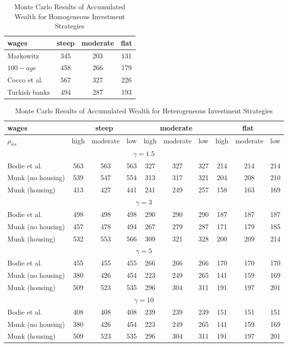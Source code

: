\begin{table}[h!]
	\centering
	\caption{Monte Carlo Results of Accumulated Wealth for Homogeneous Investment Strategies}
	\label{table:wealthhom}
	\begin{tabular}[c]{|l|c|c|c|}
		\hline
		 wages& steep & moderate & flat\\
		\hline
Markowitz					&  345  &   203&   131\\
$100-age$					&  458  &   266&  179\\  
Cocco et al.				&  567  &   327&  226\\  
Turkish banks			 	&  494  &   287&  193\\  
	\hline
	\end{tabular}
\end{table}
\begin{table}[h!]
	\footnotesize
	\centering
	\caption{Monte Carlo Results of Accumulated Wealth for Heterogeneous Investment Strategies}
	\label{table:wealthhet}
	\begin{tabular}[c]{|l|ccc|ccc|ccc|}
		\hline
		 wages& \multicolumn{3}{c|}{steep} & \multicolumn{3}{c|}{moderate} & \multicolumn{3}{c|}{flat}\\
		\hline
		$\rho_{ws}$&high&moderate&low&high&moderate&low&high&moderate&low\\
		\hline
	\multicolumn{10}{|c|}{$\gamma=1.5$}\\
		\hline
Bodie et al.			 	&563&563&563&327&327&327&214&214&214\\  
Munk (no housing)			&539&547&554&313&317&321&204&208&210\\
Munk (housing)				&413&427&441&241&249&257&158&163&169\\
	\hline
	\multicolumn{10}{|c|}{$\gamma=3$}\\
	\hline
Bodie et al.			 	&498&498&498&290&290&290&187&187&187\\
Munk (no housing)			&457&478&494&267&279&287&171&179&185\\
Munk (housing)				&532&553&566&309&321&328&200&209&214\\
	\hline
	\multicolumn{10}{|c|}{$\gamma=5$}\\

		\hline
Bodie et al.			 	&455&455&455&266&266&266&170&170&170\\
Munk (no housing)			&380&426&454&223&249&265&141&159&169\\
Munk (housing)				&509&523&535&296&304&311&191&197&201\\
	\hline
	\multicolumn{10}{|c|}{$\gamma=10$}\\

		\hline
Bodie et al.			 	&408&408&408&239&239&239&151&151&151\\
Munk (no housing)			&380&426&454&223&249&265&141&159&169\\
Munk (housing)				&509&523&535&296&304&311&191&197&201\\
	\hline
	\end{tabular}
\end{table}

